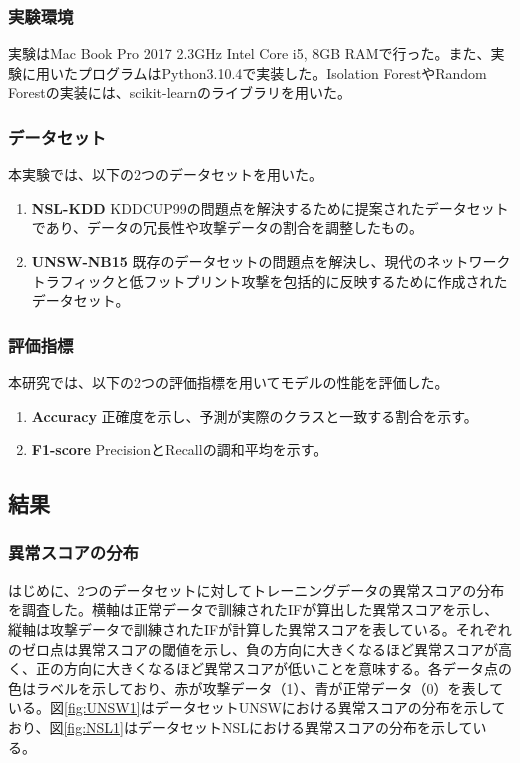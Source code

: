 \documentclass{css}
\begin{document}
\subsubsection{実験環境}

実験はMac Book Pro 2017 2.3GHz Intel Core i5, 8GB RAMで行った。また、実験に用いたプログラムはPython3.10.4で実装した。Isolation ForestやRandom Forestの実装には、scikit-learnのライブラリを用いた。

\subsubsection{データセット}
本実験では、以下の2つのデータセットを用いた。

\begin{enumerate}
    \item \textbf{NSL-KDD}
        KDDCUP99の問題点を解決するために提案されたデータセットであり、データの冗長性や攻撃データの割合を調整したもの。
    \item \textbf{UNSW-NB15}
        既存のデータセットの問題点を解決し、現代のネットワークトラフィックと低フットプリント攻撃を包括的に反映するために作成されたデータセット。
\end{enumerate}

\subsubsection{評価指標}
本研究では、以下の2つの評価指標を用いてモデルの性能を評価した。

\begin{enumerate}
    \item \textbf{Accuracy}
        正確度を示し、予測が実際のクラスと一致する割合を示す。
    \item \textbf{F1-score}
        PrecisionとRecallの調和平均を示す。
\end{enumerate}

\subsection{結果}

\subsubsection{異常スコアの分布}
はじめに、2つのデータセットに対してトレーニングデータの異常スコアの分布を調査した。横軸は正常データで訓練されたIFが算出した異常スコアを示し、縦軸は攻撃データで訓練されたIFが計算した異常スコアを表している。それぞれのゼロ点は異常スコアの閾値を示し、負の方向に大きくなるほど異常スコアが高く、正の方向に大きくなるほど異常スコアが低いことを意味する。各データ点の色はラベルを示しており、赤が攻撃データ（1）、青が正常データ（0）を表している。図\ref{fig:UNSW1}はデータセットUNSWにおける異常スコアの分布を示しており、図\ref{fig:NSL1}はデータセットNSLにおける異常スコアの分布を示している。
\end{document}
